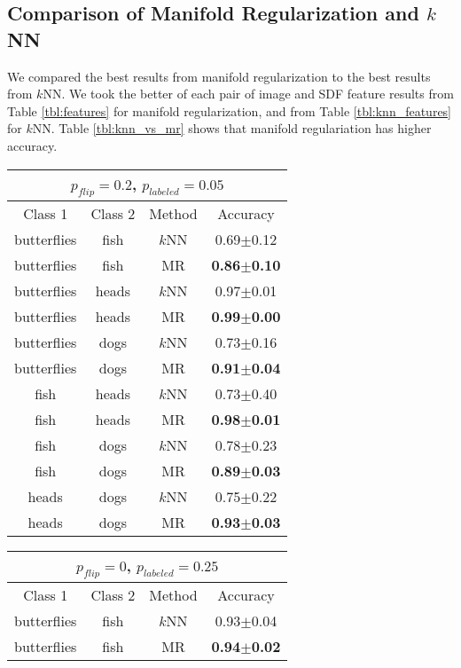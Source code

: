 \documentclass[anon,11pt]{9520} %
\begin{document}
\subsection{Comparison of Manifold Regularization and $k$NN}
We compared the best results from manifold regularization to the best results
from $k$NN. We took the better of each pair of image and SDF feature results
from Table \ref{tbl:features} for manifold regularization, and from Table
\ref{tbl:knn_features} for $k$NN. Table \ref{tbl:knn_vs_mr} shows that manifold
regulariation has higher accuracy.
\begin{table}
\tiny
\begin{center}
\begin{tabular}{|c|c|c|c|}
\multicolumn{4}{c}{$p_{flip} = 0.2$, $p_{labeled} = 0.05$}\\
\hline
Class 1 & Class 2 & Method & Accuracy\\
\hline
butterflies&	fish&  $k$NN&  0.69$\pm$0.12\\
butterflies&	fish&	MR& \textbf{0.86$\pm$0.10}\\\hline

butterflies&	heads&	$k$NN& 0.97$\pm$0.01\\
butterflies&	heads&	MR& \textbf{0.99$\pm$0.00}\\\hline

butterflies&	dogs&	$k$NN& 0.73$\pm$0.16\\
butterflies&	dogs&	MR& \textbf{0.91$\pm$0.04}\\\hline

fish&	heads&		$k$NN& 0.73$\pm$0.40\\
fish&	heads&	MR& \textbf{0.98$\pm$0.01}\\\hline

fish&	dogs&		$k$NN& 0.78$\pm$0.23\\
fish&	dogs&	MR& \textbf{0.89$\pm$0.03}\\\hline

heads&	dogs&	$k$NN&	0.75$\pm$0.22\\
heads&	dogs&	MR& \textbf{0.93$\pm$0.03}\\\hline
\end{tabular}
\begin{tabular}{|c|c|c|c|}
\multicolumn{4}{c}{$p_{flip} = 0$, $p_{labeled} = 0.25$}\\
\hline
Class 1 & Class 2 & Method & Accuracy\\
\hline
butterflies&	fish&	$k$NN& 0.93$\pm$0.04\\
butterflies&	fish&	MR& 	\textbf{0.94$\pm$0.02}\\\hline


\end{tabular}
\end{center}
\end{table}
\end{document}
